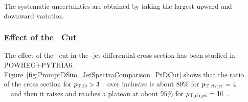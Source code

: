 The systematic uncertainties are obtained by taking the largest upward and downward variation.

%

\subsubsection{Effect of the \ptd\ Cut}
The effect of the \ptd\ cut in the \Dstar-jet differential cross section has been studied in POWHEG+PYTHIA6.
Figure~\ref{fig:PromptDSim_JetSpectraComparison_PtDCut} shows that
the ratio of the cross section for $p_{\mathrm{T,D}}>3$~\GeVc\ over inclusive is about $80$\% for $p_{\mathrm{T,ch\, jet}}=4$~\GeVc\ and then it raises and reaches a plateau at about $95$\% for $p_{\mathrm{T,ch\, jet}}=10$~\GeVc.

